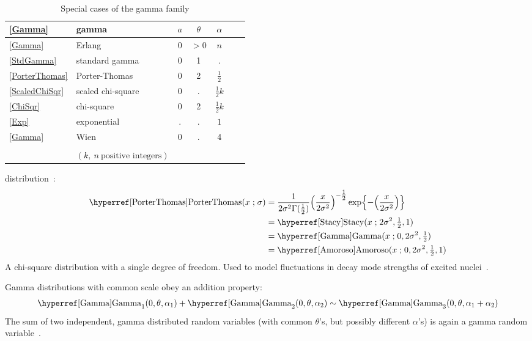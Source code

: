 \begin{table}[tp]
\begin{center}
\caption[Gamma distribution -- Special cases]{Special cases of the gamma family}
\label{GammaTable}
~\\
{\renewcommand{\arraystretch}{1.2} 
\begin{tabular}{llccccl}
\eqref{Gamma} & gamma & $a$ & $\theta$ & $\alpha$   \\ 
\hline
\eqref{Gamma} & Erlang & $0$ & $>\!\!0$ & $n$ \\
\eqref{StdGamma} &standard gamma & 0 & 1 & .  \\ 
\eqref{PorterThomas} & Porter-Thomas & 0 & 2 & $\tfrac{1}{2}$  \\
\eqref{ScaledChiSqr} & scaled chi-square & 0 & . & $\tfrac{1}{2}k$  \\
\eqref{ChiSqr} & chi-square & 0 & 2 & $\tfrac{1}{2}k$ \\
\eqref{Exp} & exponential & . & . & $1$  \\
\eqref{Gamma} & Wien & 0 & . & 4 \\
 \\
  & $(k,\ n\ \text{positive integers})$
 \end{tabular} 
}
\end{center}
\end{table}



 distribution~\cite{Porter1956a}:
\begin{align}
\label{PorterThomas}
\opr{PorterThomas}(x \given \sigma) 
&= \frac{1}{2\sigma^2\Gamma(\tfrac{1}{2})} \Left(\frac{x}{2\sigma^2}\Right)^{-\tfrac{1}{2}} 
\exp\Left\{-\Left(\frac{x}{2\sigma^2} \Right)\Right\} \checked \\
&=  \opr{Stacy}(x\given 2\sigma^2, \tfrac{1}{2},1)  \checked\notag \\
&=\opr{Gamma}(x\given 0, 2\sigma^2, \tfrac{1}{2}) \checked \notag \\
&=  \opr{Amoroso}(x\given  0, 2\sigma^2, \tfrac{1}{2}, 1) \checked \notag 
\end{align}
A chi-square distribution with a single degree of freedom.
Used to model fluctuations in decay mode strengths of excited nuclei~\cite{Porter1956a}.




\label{GammaInterrelations}



Gamma distributions with common scale obey an addition property:
\begin{align*}
\opr{Gamma}_1(0, \theta, \alpha_1) +  \opr{Gamma}_2(0, \theta,\alpha_2) \sim \opr{Gamma}_3(0, \theta,\alpha_1+\alpha_2)
\checked
\end{align*}
The  sum of two independent, gamma distributed random variables (with common $\theta$'s, but possibly different $\alpha$'s) is again a gamma random variable~\cite{Johnson1994}.

